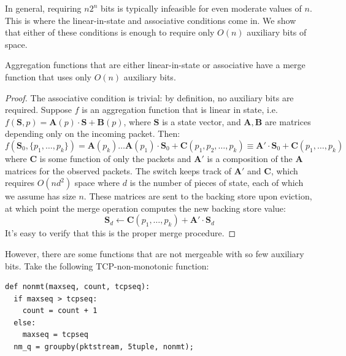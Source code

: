 In general, requiring $n2^n$ bits is typically infeasible for even moderate values of $n$. This is where the linear-in-state and associative conditions come in. We show that either of these conditions is enough to require only $O(n)$ auxiliary bits of space.

\begin{theorem}
 Aggregation functions that are either linear-in-state or associative have a merge function that uses only $O(n)$ auxiliary bits.
\end{theorem}
\begin{proof}
The associative condition is trivial: by definition, no auxiliary bits are required. 
Suppose $f$ is an aggregation function that is linear in state, i.e. $f(\mathbf{S}, p) = \mathbf{A}(p) \cdot \mathbf{S} + \mathbf{B}(p)$, where $\mathbf{S}$ is a state vector, and $\mathbf{A,B}$ are matrices depending only on the incoming packet. Then:
\[ f(\mathbf{S}_0, \{p_1, \ldots, p_k\}) = \mathbf{A}(p_k)\ldots \mathbf{A}(p_1) \cdot \mathbf{S}_0 + \mathbf{C}(p_1, p_2, \ldots, p_k) \equiv \mathbf{A'} \cdot \mathbf{S}_0 + \mathbf{C}(p_1, \ldots, p_k)\]
where $\mathbf{C}$ is some function of only the packets and $\mathbf{A'}$ is a composition of the $\mathbf{A}$ matrices for the observed packets. The switch keeps track of $\mathbf{A'}$ and $\mathbf{C}$, which requires $O(nd^2)$ space where $d$ is the number of pieces of state, each of which we assume has size $n$. These matrices are sent to the backing store upon eviction, at which point the merge operation computes the new backing store value:
\[ \mathbf{S}_d \leftarrow \mathbf{C}(p_1, \ldots, p_k) + \mathbf{A'} \cdot \mathbf{S}_d \]
It's easy to verify that this is the proper merge procedure.
\end{proof}

However, there are some functions that are not mergeable with so few auxiliary bits. Take the following TCP-non-monotonic function:
\begin{verbatim}
def nonmt(maxseq, count, tcpseq):
  if maxseq > tcpseq:
    count = count + 1
  else:
    maxseq = tcpseq
  nm_q = groupby(pktstream, 5tuple, nonmt);
\end{verbatim}

